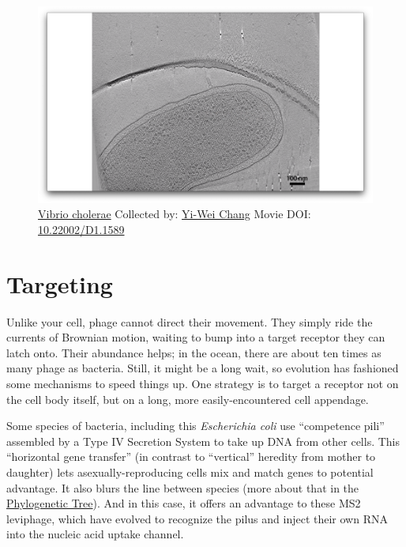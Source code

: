 \documentclass[]{tufte-book}
\begin{document}
\begin{figure}
\includegraphics{movie_stills/10_4} \caption[\protect\hyperlink{tree}{Vibrio cholerae} Collected by:
\protect\hyperlink{yi-wei_chang}{Yi-Wei Chang} Movie DOI:
\href{https://doi.org/10.22002/D1.1589}{10.22002/D1.1589}]{\protect\hyperlink{tree}{Vibrio cholerae} Collected by:
\protect\hyperlink{yi-wei_chang}{Yi-Wei Chang} Movie DOI:
\href{https://doi.org/10.22002/D1.1589}{10.22002/D1.1589}}\label{fig:10-4}
\end{figure}

\section{Targeting}\label{targeting}

Unlike your cell, phage cannot direct their movement. They simply ride
the currents of Brownian motion, waiting to bump into a target receptor
they can latch onto. Their abundance helps; in the ocean, there are
about ten times as many phage as bacteria. Still, it might be a long
wait, so evolution has fashioned some mechanisms to speed things up. One
strategy is to target a receptor not on the cell body itself, but on a
long, more easily-encountered cell appendage.

Some species of bacteria, including this \emph{Escherichia coli} use
``competence pili'' assembled by a Type IV Secretion System to take up
DNA from other cells. This ``horizontal gene transfer'' (in contrast to
``vertical'' heredity from mother to daughter) lets
asexually-reproducing cells mix and match genes to potential advantage.
It also blurs the line between species (more about that in the
\protect\hyperlink{tree}{Phylogenetic Tree}). And in this case, it
offers an advantage to these MS2 leviphage, which have evolved to
recognize the pilus and inject their own RNA into the nucleic acid
uptake channel.
\end{document}
